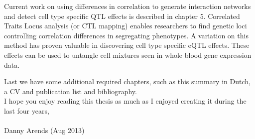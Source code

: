 Current work on using differences in correlation to generate interaction networks and detect 
cell type specific QTL effects is described in chapter 5. Correlated Traits Locus analysis 
(or CTL mapping) enables researchers to find genetic loci controlling correlation differences 
in segregating phenotypes. A variation on this method has proven valuable in discovering cell 
type specific eQTL effects. These effects can be used to untangle cell mixtures seen in whole 
blood gene expression data.


Last we have some additional required chapters, such as this summary in Dutch, a CV and publication 
list and bibliography.\\

I hope you enjoy reading this thesis as much as I enjoyed creating it during the last four years,\\\\

Danny Arends (Aug 2013)

\newpage
